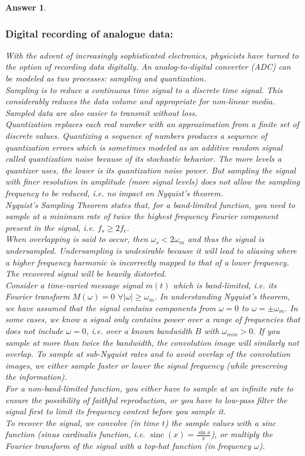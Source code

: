 \documentclass[a4paper]{article}
\DeclareMathOperator{\sinc}{sinc}
\newtheorem{ans}{Answer}[subsection]
\theoremstyle{new}
\begin{document}
\begin{ans}
\subsubsection*{Digital recording of analogue data:}
With the advent of increasingly sophisticated electronics, physicists have turned to the option of recording data digitally. An analog-to-digital converter (ADC) can be modeled as two processes: sampling and quantization.\\[5pt]
Sampling is to reduce a continuous time signal to a discrete time signal. This considerably reduces the data volume and appropriate for non-linear media. Sampled data are also easier to transmit without loss.\\[5pt]
Quantization replaces each real number with an approximation from a finite set of discrete values. Quantizing a sequence of numbers produces a sequence of quantization errors which is sometimes modeled as an additive random signal called quantization noise because of its stochastic behavior. The more levels a quantizer uses, the lower is its quantization noise power. But sampling the signal with finer resolution in amplitude (more signal levels) does not allow the sampling frequency to be reduced, i.e. no impact on Nyquist's theorem.\\[5pt]
Nyquist's Sampling Theorem states that, for a band-limited function, you need to sample at a minimum rate of twice the highest frequency Fourier component present in the signal, i.e. $f_s\geq 2f_c$.\\[5pt]
When overlapping is said to occur, then $\omega_s<2\omega_m$ and thus the signal is undersampled. Undersampling is undesirable because it will lead to aliasing where a higher frequency harmonic is incorrectly mapped to that of a lower frequency. The recovered signal will be heavily distorted.\\[5pt]
Consider a time-varied message signal $m(t)$ which is band-limited, i.e. its Fourier transform $M(\omega)=0$ $\forall|\omega|\geq\omega_m$. In understanding Nyquist's theorem, we have assumed that the signal contains components from $\omega=0$ to $\omega=\pm\omega_m$. In some cases, we know a signal only contains power over a range of frequencies that does not include $\omega=0$, i.e. over a known bandwidth $B$ with $\omega_{min}>0$. If you sample at more than twice the bandwidth, the convolution image will similarly not overlap. To sample at sub-Nyquist rates and to avoid overlap of the convolution images, we either sample faster or lower the signal frequency (while preserving the information).\\[5pt]
For a non-band-limited function, you either have to sample at an infinite rate to ensure the possibility of faithful reproduction, or you have to low-pass filter the signal first to limit its frequency content before you sample it.\\[5pt]
To recover the signal, we convolve (in time $t$) the sample values with a sinc function (sinus cardinalis function, i.e. $\sinc(x)=\frac{\sin x}{x}$), or multiply the Fourier transform of the signal with a top-hat function (in frequency $\omega$).
\end{ans}
\newpage
\end{document}
